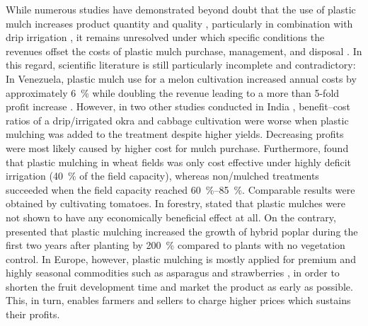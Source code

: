 While numerous studies have demonstrated beyond doubt that the use of plastic mulch increases product quantity and quality \citep[for instance][]{LaugaleInfluence2015,OverbeckReflective2013, Ruiz-MachucaCultivation2015}, particularly in combination with drip irrigation \citep{BiswasEffect2015,Lopez-LopezWater2015}, it remains unresolved under which specific conditions the revenues offset the costs of plastic mulch purchase, management, and disposal \citep{FisherAlternative1995,MugallaProfitability1996}. In this regard, scientific literature is still particularly incomplete and contradictory: In Venezuela, plastic mulch use for a melon cultivation increased annual costs by approximately \SI{6}{\percent} while doubling the revenue leading to a more than 5-fold profit increase \citep{NavaBeneficios2011}. However, in two other studies conducted in India \citep{TiwariResponse1998,TiwariEffect2003}, benefit--cost ratios of a drip\-/irrigated okra and cabbage cultivation were worse when plastic mulching was added to the treatment despite higher yields. Decreasing profits were most likely caused by higher cost for mulch purchase. Furthermore, \citet{XieEffect2005} found that plastic mulching in wheat fields was only cost effective under highly deficit irrigation (\SI{40}{\percent} of the field capacity), whereas non\-/mulched treatments succeeded when the field capacity reached \SIrange[range-phrase = { to }]{60}{85}{\percent}. Comparable results were obtained by \citet{BiswasEffect2015} cultivating tomatoes. In forestry, \citet{LeclercPaillage1997} stated that plastic mulches were not shown to have any economically beneficial effect at all. On the contrary, \citet{BohleniusExploration2015} presented that plastic mulching increased the growth of hybrid poplar during the first two years after planting by \SI{200}{\percent} compared to plants with no vegetation control. In Europe, however, plastic mulching is mostly applied for premium and highly seasonal commodities such as asparagus and strawberries \citep{HeissnerComparison2005,StevensHorticultural2011}, in order to shorten the fruit development time and market the product as early as possible. This, in turn, enables farmers and sellers to charge higher prices \citep{JohnsonWeed2005,PolingFrost1991} which sustains their profits.

